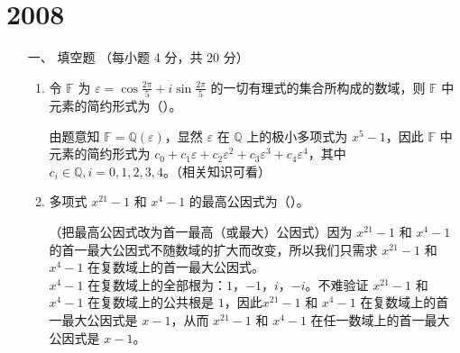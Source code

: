 \section{2008}
\begin{enumerate}[1~]
\renewcommand{\labelenumi}{\textbf{\theenumi. }}
\renewcommand{\Im}{\text{Im }}
\item[一、]
填空题 （每小题 4 分，共 20 分）
\begin{enumerate}[1.~]
\item
令 $\mathbb{F}$ 为 $\varepsilon=\cos \frac{2 \pi}{5}+i\sin \frac{2\pi}{5}$ 的一切有理式的集合所构成的数域，则 $\mathbb{F}$ 中元素的简约形式为（\quad）。
\begin{solution}
由题意知 $\mathbb{F} = \mathbb{Q}(\varepsilon)$，显然 $\varepsilon$ 在 $\mathbb{Q}$ 上的极小多项式为 $x^5 - 1$，因此 $\mathbb{F}$ 中元素的简约形式为 $c_0 + c_1 \varepsilon + c_2 \varepsilon^2 + c_3 \varepsilon^3 + c_4 \varepsilon^4$，其中 $c_i \in \mathbb{Q}, i = 0, 1, 2, 3, 4$。（相关知识可看\cite{qiujin}）
\end{solution}

\item
多项式 $x^{21} - 1$ 和 $x^4 - 1$ 的最高公因式为（\quad）。
\begin{solution}
（把最高公因式改为首一最高（或最大）公因式）因为 $x^{21} - 1$ 和 $x^4 - 1$ 的首一最大公因式不随数域的扩大而改变，所以我们只需求 $x^{21} - 1$ 和 $x^4 - 1$ 在复数域上的首一最大公因式。\\
$x^4-1$ 在复数域上的全部根为：$1$，$-1$，$i$，$-i$。不难验证 $x^{21} - 1$ 和 $x^4 - 1$ 在复数域上的公共根是 $1$，因此$x^{21} - 1$ 和 $x^4 - 1$ 在复数域上的首一最大公因式是 $x - 1$，从而 $x^{21} - 1$ 和 $x^4 - 1$ 在任一数域上的首一最大公因式是 $x - 1$。
\end{solution}


\end{enumerate}
\end{enumerate}

